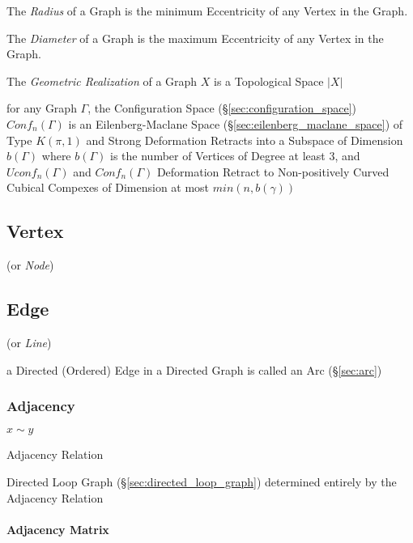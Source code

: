 The \emph{Radius} of a Graph is the minimum Eccentricity of any
Vertex in the Graph.

The \emph{Diameter} of a Graph is the maximum Eccentricity of any
Vertex in the Graph.

The \emph{Geometric Realization} of a Graph $X$ is a Topological Space
$|X|$ %

for any Graph $\Gamma$, the Configuration Space
(\S\ref{sec:configuration_space}) $Conf_n(\Gamma)$ is an Eilenberg-Maclane
Space (\S\ref{sec:eilenberg_maclane_space}) of Type $K(\pi,1)$ and Strong
Deformation Retracts into a Subspace of Dimension $b(\Gamma)$ where $b(\Gamma)$
is the number of Vertices of Degree at least 3, and $Uconf_n(\Gamma)$ and
$Conf_n(\Gamma)$ Deformation Retract to Non-positively Curved Cubical Compexes
of Dimension at most $min(n,b(\gamma))$



\subsection{Vertex}\label{sec:vertex}

(or \emph{Node})



\subsection{Edge}\label{sec:edge}

(or \emph{Line})

a Directed (Ordered) Edge in a Directed Graph is called an Arc
(\S\ref{sec:arc})



\subsubsection{Adjacency}\label{sec:adjacency}

$x \sim y$

Adjacency Relation

Directed Loop Graph (\S\ref{sec:directed_loop_graph}) determined
entirely by the Adjacency Relation



\paragraph{Adjacency Matrix}\label{sec:adjacency_matrix}\hfill

